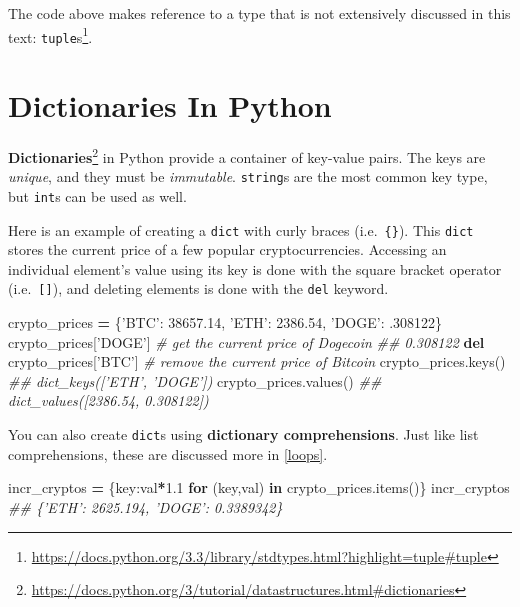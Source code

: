 \documentclass[12pt,krantz2]{krantz}
\makeatletter
\newenvironment{Shaded}{\begin{snugshade}}{\end{snugshade}}
\newcommand{\CommentTok}[1]{\textcolor[rgb]{0.37,0.37,0.37}{\textit{#1}}}
\newcommand{\ControlFlowTok}[1]{\textcolor[rgb]{0.27,0.27,0.27}{\textbf{#1}}}
\newcommand{\FloatTok}[1]{\textcolor[rgb]{0.06,0.06,0.06}{#1}}
\newcommand{\KeywordTok}[1]{\textcolor[rgb]{0.27,0.27,0.27}{\textbf{#1}}}
\newcommand{\NormalTok}[1]{#1}
\newcommand{\OperatorTok}[1]{\textcolor[rgb]{0.43,0.43,0.43}{\textbf{#1}}}
\newcommand{\StringTok}[1]{\textcolor[rgb]{0.5,0.5,0.5}{#1}}
\renewcommand{\href}[2]{#2\footnote{\url{#1}}}
\newenvironment{kframe}{%
\medskip{}
\setlength{\fboxsep}{.8em}
 \def\at@end@of@kframe{}%
 \ifinner\ifhmode%
  \def\at@end@of@kframe{\end{minipage}}%
  \begin{minipage}{\columnwidth}%
 \fi\fi%
 \def\FrameCommand##1{\hskip\@totalleftmargin \hskip-\fboxsep
 \colorbox{shadecolor}{##1}\hskip-\fboxsep
     \hskip-\linewidth \hskip-\@totalleftmargin \hskip\columnwidth}%
 \MakeFramed {\advance\hsize-\width
   \@totalleftmargin\z@ \linewidth\hsize
   \@setminipage}}%
 {\par\unskip\endMakeFramed%
 \at@end@of@kframe}
\renewenvironment{Shaded}{\begin{kframe}}{\end{kframe}}
\makeatother
\begin{document}
The code above makes reference to a type that is not extensively discussed in this text: \href{https://docs.python.org/3.3/library/stdtypes.html?highlight=tuple\#tuple}{\texttt{tuple}s}.

\hypertarget{dictionaries-in-python}{%
\section{Dictionaries In Python}\label{dictionaries-in-python}}

\href{https://docs.python.org/3/tutorial/datastructures.html\#dictionaries}{\textbf{Dictionaries}} in Python provide a container of key-value pairs. The keys are \emph{unique}, and they must be \emph{immutable}. \texttt{string}s are the most common key type, but \texttt{int}s can be used as well.

Here is an example of creating a \texttt{dict} with curly braces (i.e.~\texttt{\{\}}). This \texttt{dict} stores the current price of a few popular cryptocurrencies. Accessing an individual element's value using its key is done with the square bracket operator (i.e.~\texttt{{[}{]}}), and deleting elements is done with the \texttt{del} keyword.

\begin{Shaded}
\begin{Highlighting}[]
\NormalTok{crypto_prices }\OperatorTok{=}\NormalTok{ \{}\StringTok{'BTC'}\NormalTok{: }\FloatTok{38657.14}\NormalTok{, }\StringTok{'ETH'}\NormalTok{: }\FloatTok{2386.54}\NormalTok{, }\StringTok{'DOGE'}\NormalTok{: }\FloatTok{.308122}\NormalTok{\}}
\NormalTok{crypto_prices[}\StringTok{'DOGE'}\NormalTok{] }\CommentTok{# get the current price of Dogecoin}
\CommentTok{## 0.308122}
\KeywordTok{del}\NormalTok{ crypto_prices[}\StringTok{'BTC'}\NormalTok{] }\CommentTok{# remove the current price of Bitcoin}
\NormalTok{crypto_prices.keys()}
\CommentTok{## dict_keys(['ETH', 'DOGE'])}
\NormalTok{crypto_prices.values()}
\CommentTok{## dict_values([2386.54, 0.308122])}
\end{Highlighting}
\end{Shaded}

You can also create \texttt{dict}s using \textbf{dictionary comprehensions}. Just like list comprehensions, these are discussed more in \ref{loops}.

\begin{Shaded}
\begin{Highlighting}[]
\NormalTok{incr_cryptos }\OperatorTok{=}\NormalTok{ \{key:val}\OperatorTok{*}\FloatTok{1.1} \ControlFlowTok{for}\NormalTok{ (key,val) }\KeywordTok{in}\NormalTok{ crypto_prices.items()\}}
\NormalTok{incr_cryptos}
\CommentTok{## \{'ETH': 2625.194, 'DOGE': 0.3389342\}}
\end{Highlighting}
\end{Shaded}
\end{document}
